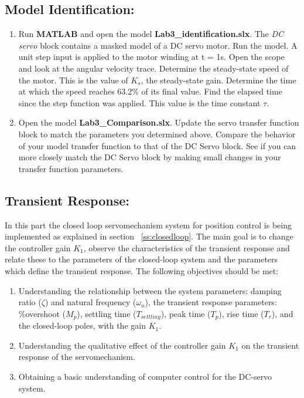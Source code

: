 \documentclass[11pt,a4paper]{article}
\begin{document}
\subsection{Model Identification:}
\begin{enumerate}
\item Run \textbf{MATLAB} and open the model \textbf{Lab3\_identification.slx}. The \textit{DC servo} block contains a masked model of a DC servo motor. Run the model. A unit step input is applied to the motor winding at t = 1s. Open the scope and look at the angular velocity trace. Determine the steady-state speed of the motor. This is the value of $K_{s}$, the steady-state gain. Determine the time at which the speed reaches 63.2\% of its final value. Find the elapsed time since the step function was applied. This value is the time constant $\tau$.
\item Open the model \textbf{Lab3\_Comparison.slx}. Update the servo transfer function block to match the parameters you determined above. Compare the behavior of your model transfer function to that of the DC Servo block. See if you can more closely match the DC Servo block by making small changes in your transfer function parameters.
\end{enumerate}

\subsection{Transient Response:}
In this part the closed loop servomechanism system for position control is being implemented as explained in section ~\ref{ss:closedloop}. The main goal is to change the controller gain $K_{1}$, observe the characteristics of the transient response and relate these to the parameters of the closed-loop system and the parameters which define the transient response.
The following objectives should be met:
\begin{enumerate}
\item Understanding the relationship between the system parameters: damping ratio ($\zeta$) and natural frequency ($\omega_{n}$), the transient response parameters: \%overshoot ($M_{p}$), settling time ($T_{settling}$), peak time ($T_{p}$), rise time ($T_{r}$), and the closed-loop poles, with the gain $K_{1}$.

\item Understanding the qualitative effect of the controller gain $K_{1}$ on the transient response of the servomechanism.

\item Obtaining a basic understanding of computer control for the DC-servo system.
\end{enumerate}
\end{document}
